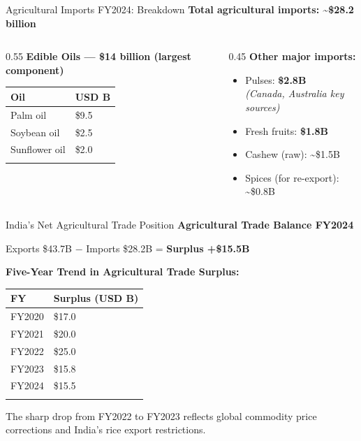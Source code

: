 \documentclass[
  ignorenonframetext,
  aspectratio=169,
]{beamer}
\makeatletter
\providecommand{\tightlist}{%
  \setlength{\itemsep}{0pt}\setlength{\parskip}{0pt}}
\let\quarto@originallabel\label
\DeclareRobustCommand*{\label}[1]{\quarto@originallabel{#1}}
\makeatother
\begin{document}
\begin{frame}{Agricultural Imports FY2024: Breakdown}
\label{agricultural-imports-fy2024-breakdown}
\textbf{Total agricultural imports: \textasciitilde\$28.2 billion}

\begin{columns}[T]
\begin{column}{0.55\linewidth}
\textbf{Edible Oils --- \$14 billion (largest component)}

\begin{longtable}[]{@{}ll@{}}
\toprule\noalign{}
Oil & USD B \\
\midrule\noalign{}
\endhead
Palm oil & \$9.5 \\
Soybean oil & \$2.5 \\
Sunflower oil & \$2.0 \\
\bottomrule\noalign{}
\end{longtable}
\end{column}

\begin{column}{0.45\linewidth}
\textbf{Other major imports:}

\begin{itemize}
\tightlist
\item
  Pulses: \textbf{\$2.8B}\\
  \emph{(Canada, Australia key sources)}
\item
  Fresh fruits: \textbf{\$1.8B}
\item
  Cashew (raw): \textasciitilde\$1.5B
\item
  Spices (for re-export): \textasciitilde\$0.8B
\end{itemize}
\end{column}
\end{columns}
\end{frame}

\begin{frame}{India's Net Agricultural Trade Position}
\label{indias-net-agricultural-trade-position}
\textbf{Agricultural Trade Balance FY2024}

Exports \$43.7B − Imports \$28.2B = \textbf{Surplus +\$15.5B}

\textbf{Five-Year Trend in Agricultural Trade Surplus:}

\begin{longtable}[]{@{}ll@{}}
\toprule\noalign{}
FY & Surplus (USD B) \\
\midrule\noalign{}
\endhead
FY2020 & \$17.0 \\
FY2021 & \$20.0 \\
FY2022 & \$25.0 \\
FY2023 & \$15.8 \\
FY2024 & \$15.5 \\
\bottomrule\noalign{}
\end{longtable}

The sharp drop from FY2022 to FY2023 reflects global commodity price
corrections and India's rice export restrictions.
\end{frame}
\end{document}
